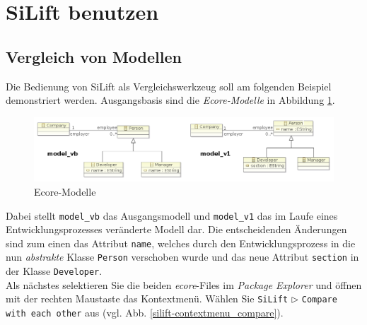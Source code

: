 \section{SiLift benutzen}
\subsection{Vergleich von Modellen}
Die Bedienung von SiLift als Vergleichswerkzeug soll am folgenden Beispiel demonstriert werden.
Ausgangsbasis sind die \textit{Ecore-Modelle} in Abbildung \ref{classdiagram_example}.

\begin{figure}[h!]
\centering
\includegraphics[width=\textwidth]{lifting/graphics/ecore-classdiagram_example.png}
\caption{Ecore-Modelle}
\label{classdiagram_example}
\end{figure}

Dabei stellt \texttt{model\_vb} das Ausgangsmodell und \texttt{model\_v1} das im Laufe eines Entwicklungsprozesses veränderte Modell dar.
Die entscheidenden Änderungen sind zum einen das Attribut \texttt{name}, welches durch den Entwicklungsprozess in die nun \textit{abstrakte} Klasse \texttt{Person} verschoben wurde und das neue Attribut \texttt{section} in der Klasse \texttt{Developer}.\\
Als nächstes selektieren Sie die beiden \textit{ecore}-Files im \textit{Package Explorer} und öffnen mit der rechten Maustaste das Kontextmenü.
Wählen Sie \texttt{SiLift} $\triangleright$ \texttt{Compare with each other} aus (vgl. Abb. \ref{silift-contextmenu_compare}).

